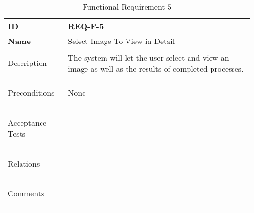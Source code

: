 \begin{table}[H]
    \begin{tabular}[t]{ | >{\bfseries}l | p{9.5cm} |}

    \hline
    ID
    &  REQ-F-5 \\ \hline

    Name
    & Select Image To View in Detail \\ \hline

    Description
    &  The system will let the user select and view an image as well as the results of completed processes. \\ \hline

    Preconditions
    & None \\ \hline

    Acceptance Tests
    & \\ \hline

    Relations
    &  \\ \hline

    Comments
    &  \\ \hline

    \end{tabular}

    \caption{Functional Requirement 5}
    \label{fig:req_f_5}

\end{table}